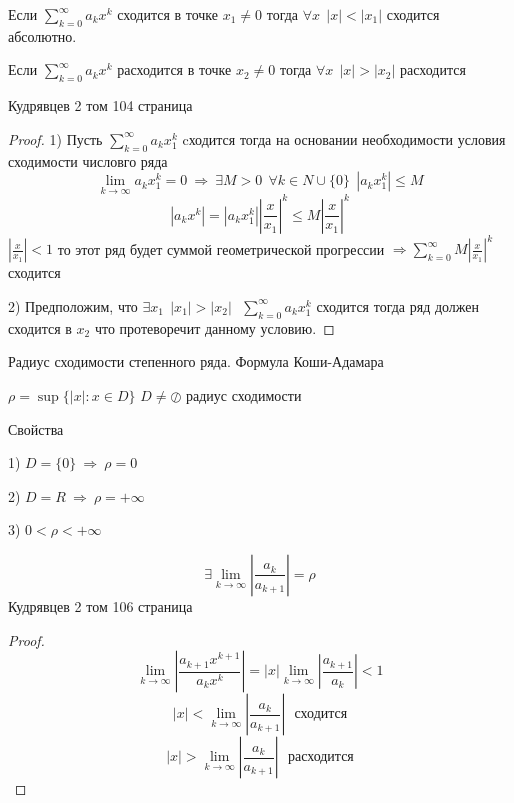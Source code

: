 \begin{theorem}[Абеля]
  Если $\sum_{k=0}^{\infty} a_k x^k$ сходится в точке $x_1 \not= 0$ тогда
  $\forall x ~~ |x| < |x_1|$ сходится абсолютно.

  Если $\sum_{k=0}^{\infty} a_k x^k$ расходится в точке $x_2 \not= 0$ тогда
  $\forall x ~~ |x| > |x_2|$ расходится

  Кудрявцев 2 том 104 страница
\end{theorem}

\begin{proof}
  1) Пусть $\sum_{k = 0}^{\infty}a_k x_1^k$ cходится тогда на основании
  необходимости условия сходимости числовго ряда
  $$
  \lim_{k \to \infty} a_k x_1^k = 0 ~ \Rightarrow ~ \exists M > 0 ~~
  \forall k \in N \cup \{0\} ~~ |a_k x_1^k| \le M
  $$
  $$
  |a_k x^k| = |a_k x_1^k| \left| \frac{x}{x_1} \right|^k \le
  M \left| \frac{x}{x_1} \right|^k
  $$
  $\left| \frac{x}{x_1} \right| < 1$ то этот ряд будет суммой геометрической
  прогрессии $\Rightarrow \sum_{k=0}^{\infty} M \left| \frac{x}{x_1} \right|^k$
  сходится

  2) Предположим, что $\exists x_1 ~~ |x_1| > |x_2| ~~~
  \sum_{k=0}^{\infty} a_k x_1^k$ сходится тогда ряд должен сходится в $x_2$
  что протеворечит данному условию.
\end{proof}

\begin{title}[\Large]
  Радиус сходимости степенного ряда. Формула Коши-Адамара
\end{title}

\begin{define}
  $\rho = \sup\{ |x| : x \in D \}$ $D \not= \oslash$ радиус сходимости

  Свойства

  1) $D = \{0\} ~ \Rightarrow ~ \rho = 0$

  2) $D = R ~ \Rightarrow ~ \rho = +\infty$

  3) $0 < \rho < +\infty$
\end{define}

\begin{theorem}
  $$
  \exists \lim_{k \to \infty} \left| \frac{a_k}{a_{k+1}} \right| = \rho
  $$
  Кудрявцев 2 том 106 страница
\end{theorem}

\begin{proof}
  $$
  \lim_{k \to \infty} \left| \frac{a_{k+1} x^{k+1}}{a_k x^k} \right| =
  |x| \lim_{k \to \infty} \left| \frac{a_{k+1}}{a_k} \right| < 1
  $$
  $$
  |x| < \lim_{k \to \infty} \left| \frac{a_k}{a_{k+1}} \right| ~~~
  \text{сходится}
  $$
  $$
  |x| > \lim_{k \to \infty} \left| \frac{a_k}{a_{k+1}} \right| ~~~
  \text{расходится}
  $$
\end{proof}

